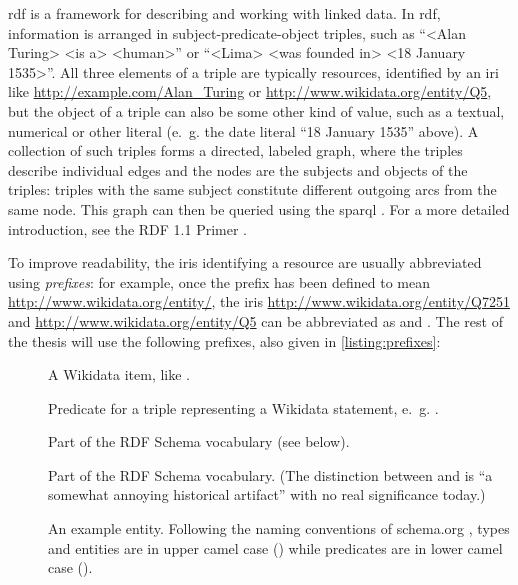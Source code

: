 \acrfull{rdf}
\cite{Lanthaler:14:RCA}
is a framework for describing and working with linked data.
In \gls{rdf}, information is arranged in \gls{subject}-\gls{predicate}-\gls{object} \glspl{triple},
such as “<Alan Turing> <is a> <human>”
or “<Lima> <was founded in> <18 January 1535>”.
All three elements of a \gls{triple} are typically \glspl{resource},
identified by an \gls{iri} like \url{http://example.com/Alan_Turing} or \url{http://www.wikidata.org/entity/Q5},
but the \gls{object} of a \gls{triple} can also be some other kind of value,
such as a textual, numerical or other literal
(e.~g. the date literal “18 January 1535” above). %
A collection of such \glspl{triple} forms a directed, labeled graph,
where the \glspl{triple} describe individual edges
and the nodes are the \glspl{subject} and \glspl{object} of the \glspl{triple}:
\glspl{triple} with the same \gls{subject} constitute different outgoing arcs from the same node.
This graph can then be queried using the \acrlong{sparql} \cite{9569543}. %
For a more detailed introduction,
see the RDF 1.1 Primer \cite{Schreiber:14:RP}.

To improve readability, the \glspl{iri} identifying a \gls{resource} are usually abbreviated using \emph{prefixes}:
for example, once the prefix  has been defined to mean \url{http://www.wikidata.org/entity/},
the \glspl{iri} \url{http://www.wikidata.org/entity/Q7251} and \url{http://www.wikidata.org/entity/Q5}
can be abbreviated as  and .
The rest of the thesis will use the following prefixes,
also given in \cref{listing:prefixes}:

\begin{description}
\item[] A \gls{Wikidata} \gls{item}, like .
\item[] Predicate for a triple representing a \gls{Wikidata} \gls{statement}, e.~g. .
\item[] Part of the RDF Schema vocabulary (see below).
\item[] Part of the RDF Schema vocabulary.
  (The distinction between  and  is “a somewhat annoying historical artifact” \cite{Schreiber:14:RP}
  with no real significance today.)
\item[] An example entity.
  Following the naming conventions of schema.org \cite{schema.org-old-extension},
  types and entities are in upper camel case ()
  while predicates are in lower camel case ().
\end{description}

